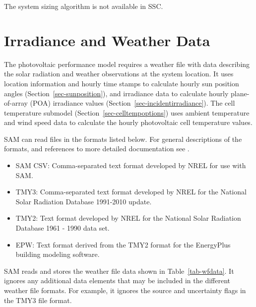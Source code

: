 \documentclass[12pt,letterpaper]{article}
\begin{document}
The system sizing algorithm is not available in SSC.

\chapter{Irradiance and Weather Data}\label{sec-irradianceweatherdata}

The photovoltaic performance model requires a weather file with data describing the solar radiation and weather observations at the system location. It uses location information and hourly time stamps to calculate hourly sun position angles (Section~\ref{sec-sunposition}),  and irradiance data to calculate hourly plane-of-array (POA) irradiance values (Section~\ref{sec-incidentirradiance}). The cell temperature submodel (Section~\ref{sec-celltempoptions}) uses ambient temperature and wind speed data to calculate the hourly photovoltaic cell temperature values.

SAM can read files in the formats listed below. For general descriptions of the formats, and references to more detailed documentation see \citep{help-weatherfileformats}.

\begin{itemize}
\item SAM CSV: Comma-separated text format developed by NREL for use with SAM.
\item TMY3: Comma-separated text format developed by NREL for the National Solar Radiation Database 1991-2010 update.
\item TMY2: Text format developed by NREL for the National Solar Radiation Database 1961 - 1990 data set.
\item EPW: Text format derived from the TMY2 format for the EnergyPlus building modeling software. 
\end{itemize}

SAM reads and stores the weather file data shown in Table~\ref{tab-wfdata}. It ignores any additional data elements that may be included in the different weather file formats. For example, it ignores the source and uncertainty flags in the TMY3 file format.
\end{document}
